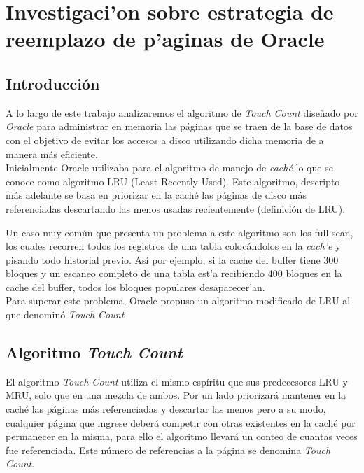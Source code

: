 \documentclass[11pt, a4paper, spanish]{article}
\newenvironment{borde}[1]
{\begin{lrbox}{\fmbox}\begin{minipage}{#1}}
{\end{minipage}\end{lrbox}\fbox{\usebox{\fmbox}}\\[10pt]}
\begin{document}


\newpage 
\section{Investigaci'on sobre estrategia de reemplazo de p'aginas de Oracle}

\subsection{Introducci\'on}

A lo largo de este trabajo analizaremos el algoritmo de \textit{Touch Count} dise\~{n}ado por \textit{Oracle} para administrar en memoria las p\'aginas que se
traen de la base de datos con el objetivo de evitar los accesos a disco utilizando dicha memoria de a manera m\'as eficiente.\\

Inicialmente Oracle utilizaba para el algoritmo de manejo de \textit{cach\'e} lo que se conoce como algoritmo LRU (Least Recently Used). Este algoritmo, 
descripto m\'as adelante se basa en priorizar en la cach\'e las p\'aginas de disco m\'as referenciadas descartando las menos usadas recientemente 
(definici\'on de LRU).

Un caso muy com\'un que presenta un problema a este algoritmo son los full scan, los cuales recorren todos los registros de una tabla coloc\'andolos en 
la \textit{cach'e} y pisando todo historial previo. As\'i por ejemplo, si la cache del buffer tiene 300 bloques y un escaneo completo de una 
tabla est'a recibiendo 400 bloques en la cache del buffer, todos los bloques populares desaparecer'an. \\

Para superar este problema, Oracle propuso un algoritmo modificado de LRU al que denomin\'o \textit{Touch Count}
  
\subsection{Algoritmo \textit{Touch Count}}

El algoritmo \textit{Touch Count} utiliza el mismo esp\'iritu que sus predecesores LRU y MRU, solo que en una mezcla de ambos. Por un lado priorizar\'a
mantener en la cach\'e las p\'aginas m\'as referenciadas y descartar las menos pero a su modo, cualquier p\'agina que ingrese deber\'a competir 
con otras existentes en la cach\'e por permanecer en la misma, para ello el algoritmo llevar\'a un conteo de cuantas veces fue referenciada. Este n\'umero
de referencias a la p\'agina se denomina \textit{Touch Count}.
\end{document}
